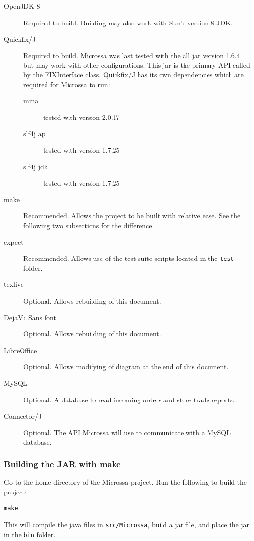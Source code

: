 \documentclass[Letter]{article}
\begin{document}
\begin{description}
    \item[OpenJDK 8] Required to build.  Building may also work with Sun's
    version 8 JDK.
    \item[Quickfix/J] Required to build. Microssa was last tested with the
    all jar version 1.6.4 but may work with other configurations. This jar
    is the primary API called by the FIXInterface class. Quickfix/J has its
    own dependencies which are required for Microssa to run:
    \begin{description}
        \item[mina] tested with version 2.0.17
        \item[slf4j api] tested with version 1.7.25
        \item[slf4j jdk] tested with version 1.7.25
    \end{description}
    \item[make] Recommended.  Allows the project to be built with
    relative ease.  See the following two subsections for the difference.
    \item[expect] Recommended.  Allows use of the test suite scripts
    located in the \texttt{test} folder.
    \item[texlive] Optional.  Allows rebuilding of this document.
    \item[DejaVu Sans font] Optional.  Allows rebuilding of this document.
    \item[LibreOffice] Optional.  Allows modifying of diagram at the end
    of this document.
    \item[MySQL] Optional.  A database to read incoming
    orders and store trade reports.
    \item[Connector/J] Optional. The API Microssa will use to communicate
    with a MySQL database.
\end{description}

\subsubsection{Building the JAR with make}

Go to the home directory of the Microssa project.  Run the following to
build the project:
\begin{verbatim}
make
\end{verbatim}

This will compile the java files in \texttt{src/Microssa}, build a
jar file, and place the jar in the \texttt{bin} folder.
\end{document}
